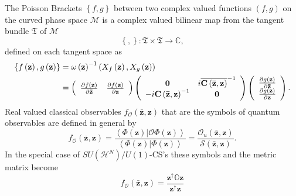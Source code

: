 \documentclass[aps,preprint]{revtex4}%
\begin{document}
The Poisson Brackets $\left\{  f,g\right\}  $ between two complex valued
functions $\left(  f,g\right)  $ on the curved phase space $\mathcal{M}$ is a
complex valued bilinear map from the tangent bundle $\mathfrak{T}$ of
$\mathcal{M}$
\begin{equation}
\left\{  ,\right\}  :\mathfrak{T}\times\mathfrak{T}\rightarrow\mathbb{C},
\end{equation}
defined on each tangent space as
\begin{align}
\left\{  f\left(  \mathbf{z}\right)  ,g\left(  \mathbf{z}\right)  \right\}
& =\omega\left(  \mathbf{z}\right)  ^{-1}\left(  X_{f}\left(  \mathbf{z}%
\right)  ,X_{g}\left(  \mathbf{z}\right)  \right)  \nonumber\\
& =\left(
\begin{array}
[c]{cc}%
\frac{\partial f\left(  \mathbf{z}\right)  }{\partial\mathbf{\bar{z}}} &
\frac{\partial f\left(  \mathbf{z}\right)  }{\partial\mathbf{z}}%
\end{array}
\right)  \left(
\begin{array}
[c]{cc}%
\mathbf{0} & i\overline{\mathbf{C}\left(  \mathbf{\bar{z},z}\right)  }^{-1}\\
-i\mathbf{C}\left(  \mathbf{\bar{z},z}\right)  ^{-1} & \mathbf{0}%
\end{array}
\right)  \left(
\begin{array}
[c]{c}%
\frac{\partial g\left(  \mathbf{z}\right)  }{\partial\mathbf{\bar{z}}}\\
\frac{\partial g\left(  \mathbf{z}\right)  }{\partial\mathbf{z}}%
\end{array}
\right)  .\label{PB}%
\end{align}
Real valued classical observables $f_{\mathcal{O}}\left(  \mathbf{\bar{z}%
,z}\right)  $ that are the symbols of quantum observables are defined in
general by
\begin{equation}
f_{\mathcal{O}}\left(  \mathbf{\bar{z},z}\right)  =\frac{\left\langle \left.
\Phi\left(  \mathbf{z}\right)  \right\vert \mathcal{O}\Phi\left(
\mathbf{z}\right)  \right\rangle }{\left\langle \left.  \Phi\left(
\mathbf{z}\right)  \right\vert \Phi\left(  \mathbf{z}\right)  \right\rangle
}=\frac{\mathcal{O}_{u}\left(  \mathbf{\bar{z},z}\right)  }{\mathcal{S}\left(
\mathbf{\bar{z},z}\right)  }.
\end{equation}
In the special case of $SU\left(  \mathcal{H}^{N}\right)  /U\left(  1\right)
$-CS's these symbols and the metric matrix become%
\begin{equation}
f_{\mathcal{O}}\left(  \mathbf{\bar{z},z}\right)  =\frac{\mathbf{z}^{\dagger
}\mathbb{O}\mathbf{z}}{\mathbf{z}^{\dagger}\mathbf{z}}%
\end{equation}
\end{document}
